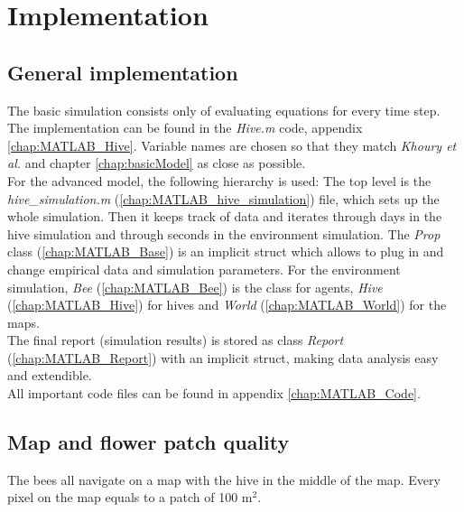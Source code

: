 \section{Implementation}
\subsection{General implementation}
	The basic simulation consists only of evaluating equations for every time step. The implementation can be found in the \textit{Hive.m} code, appendix \ref{chap:MATLAB_Hive}. Variable names are chosen so that they match \textit{Khoury et al.} \cite{khoury13} and chapter \ref{chap:basicModel} as close as possible.\\
	For the advanced model, the following hierarchy is used: The top level is the \textit{hive\_simulation.m} (\ref{chap:MATLAB_hive_simulation}) file, which sets up the whole simulation. Then it keeps track of data and iterates through days in the hive simulation and through seconds in the environment simulation. The \textit{Prop} class (\ref{chap:MATLAB_Base}) is an implicit struct which allows to plug in and change empirical data and simulation parameters. For the environment simulation, \textit{Bee} (\ref{chap:MATLAB_Bee}) is the class for agents, \textit{Hive} (\ref{chap:MATLAB_Hive}) for hives and \textit{World} (\ref{chap:MATLAB_World}) for the maps.\\
	The final report (simulation results) is stored as class \textit{Report} (\ref{chap:MATLAB_Report}) with an implicit struct, making data analysis easy and extendible.\\
	All important code files can be found in appendix \ref{chap:MATLAB_Code}.
	
\subsection{Map and flower patch quality}
	\label{chap:mapFlowerPatchQuality}
	
	The bees all navigate on a map with the hive in the middle of the map. Every pixel on the map equals to a patch of 100 m$^2$.\\
	
